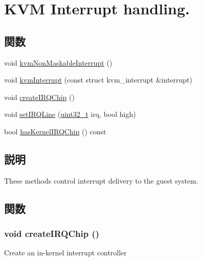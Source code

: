 \hypertarget{group__KvmInterrupts}{
\section{KVM Interrupt handling.}
\label{group__KvmInterrupts}
}
\subsection*{関数}
\begin{DoxyCompactItemize}
\item 
void \hyperlink{group__KvmInterrupts_gabc700469cba2d4bba666902e552e7c2e}{kvmNonMaskableInterrupt} ()
\item 
void \hyperlink{group__KvmInterrupts_ga16b8f95e3f70098952604e6b8a121679}{kvmInterrupt} (const struct kvm\_\-interrupt \&interrupt)
\item 
void \hyperlink{group__KvmInterrupts_ga75f1140369bf3942bb93a75d1b3de2c9}{createIRQChip} ()
\item 
void \hyperlink{group__KvmInterrupts_ga5037b917c47fff611ecdd5b547655284}{setIRQLine} (\hyperlink{Type_8hh_a435d1572bf3f880d55459d9805097f62}{uint32\_\-t} irq, bool high)
\item 
bool \hyperlink{group__KvmInterrupts_ga4e9371a3b5e598c4cde8ebef65be940f}{hasKernelIRQChip} () const 
\end{DoxyCompactItemize}


\subsection{説明}
These methods control interrupt delivery to the guest system. 

\subsection{関数}
\hypertarget{group__KvmInterrupts_ga75f1140369bf3942bb93a75d1b3de2c9}{
\subsubsection[{createIRQChip}]{\setlength{\rightskip}{0pt plus 5cm}void createIRQChip ()}}
\label{group__KvmInterrupts_ga75f1140369bf3942bb93a75d1b3de2c9}
Create an in-\/kernel interrupt controller

